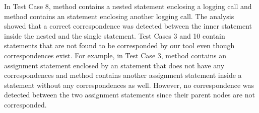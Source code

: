 In Test Case 8,  method contains a nested statement enclosing a logging call and  method contains an  statement enclosing another logging call. The analysis showed that a correct correspondence was detected between the inner statement inside the nested  and the single  statement. Test Cases 3 and 10 contain statements that are not found to be corresponded by our tool even though correspondences exist. For example, in Test Case 3,  method contains an assignment statement enclosed by an  statement that does not have any correspondences and  method contains another assignment statement inside a  statement without any correspondences as well. However, no correspondence was detected between the two assignment statements since their parent nodes are not corresponded.    

